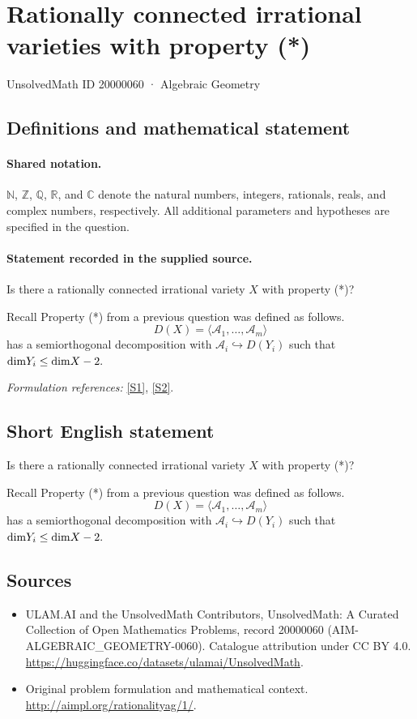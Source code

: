 \documentclass[11pt]{article}
\newcommand{\sref}[2]{\hyperlink{source:#1:#2}{[S#2]}}
\begin{document}
\setcounter{section}{20000059}
\section{Rationally connected irrational varieties with property (*)}\label{20000060}
{\small UnsolvedMath ID 20000060 · Algebraic Geometry}
\subsection{Definitions and mathematical statement}

\paragraph{Shared notation.}$\mathbb N$, $\mathbb Z$, $\mathbb Q$, $\mathbb R$, and $\mathbb C$ denote the natural numbers, integers, rationals, reals, and complex numbers, respectively. All additional parameters and hypotheses are specified in the question.


\paragraph{Statement recorded in the supplied source.}
Is there a rationally connected irrational variety $X$ with property (*)?

Recall Property (*) from a previous question was defined as follows.
\[
D(X) = \langle \mathscr A_1, \ldots, \mathscr A_m \rangle
\]
has a semiorthogonal decomposition
with $\mathscr A_i \hookrightarrow D(Y_i)$ such that ${\rm dim} Y_i \leq {\rm dim}X-2.$
\par\smallskip\textit{Formulation references:} \sref{20000060}{1}, \sref{20000060}{2}.
\subsection{Short English statement}
Is there a rationally connected irrational variety $X$ with property (*)?

Recall Property (*) from a previous question was defined as follows.
\[
D(X) = \langle \mathscr A_1, \ldots, \mathscr A_m \rangle
\]
has a semiorthogonal decomposition
with $\mathscr A_i \hookrightarrow D(Y_i)$ such that ${\rm dim} Y_i \leq {\rm dim}X-2.$
\subsection{Sources}
\begin{itemize}
\item[\hypertarget{source:20000060:1}{S1}] ULAM.AI and the UnsolvedMath Contributors, UnsolvedMath: A Curated Collection of Open Mathematics Problems, record 20000060 (AIM-ALGEBRAIC\_GEOMETRY-0060). Catalogue attribution under CC BY 4.0.
\url{https://huggingface.co/datasets/ulamai/UnsolvedMath}.
\item[\hypertarget{source:20000060:2}{S2}] Original problem formulation and mathematical context.
\url{http://aimpl.org/rationalityag/1/}.
\end{itemize}
\label{end:20000060}
\end{document}

